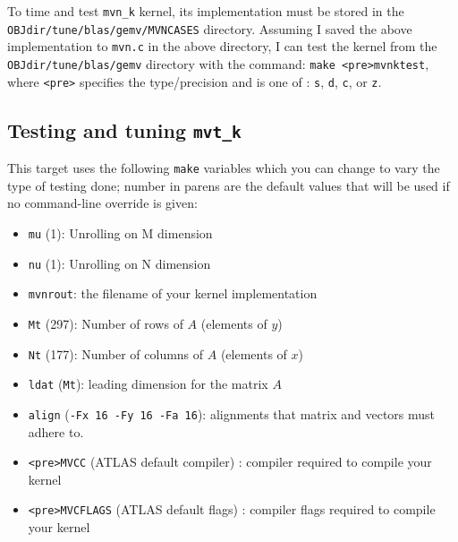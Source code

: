 \documentclass[11pt]{article}
\newcommand{\Wskip}[1]{ }
\newcommand{\kernk}[1]{{\tt #1\_k}}
\begin{document}
To time and test \kernk{mvn} kernel, its implementation must be stored in 
the {\tt OBJdir/tune/blas/gemv/MVNCASES} directory.  Assuming I saved the
above implementation to {\tt mvn.c} in the above directory, I can test
the kernel from the {\tt OBJdir/tune/blas/gemv} directory with the
command: \verb+make <pre>mvnktest+, where \verb+<pre>+ specifies the
type/precision and is one of : {\tt s}, {\tt d}, {\tt c}, or {\tt z}.
\subsection{Testing and tuning \kernk{mvt}}
This target uses the following {\tt make} variables which you can change
to vary the type of testing done; number in parens are the default values
that will be used if no command-line override is given:
\begin{itemize}
\item \verb+mu+ (1): Unrolling on M dimension
\item \verb+nu+ (1): Unrolling on N dimension
\item \verb+mvnrout+: the filename of your kernel implementation
\item \verb+Mt+ (297): Number of rows of $A$ (elements of $y$)
\item \verb+Nt+ (177): Number of columns of $A$ (elements of $x$)
\item \verb+ldat+ (\verb+Mt+): leading dimension for the matrix $A$
\item \verb+align+ (\verb+-Fx 16 -Fy 16 -Fa 16+): alignments that
      matrix and vectors must adhere to.
\item \verb+<pre>MVCC+ (ATLAS default compiler) : compiler required
      to compile your kernel
\item \verb+<pre>MVCFLAGS+ (ATLAS default flags) : compiler flags required
      to compile your kernel
\end{itemize}
\end{document}

